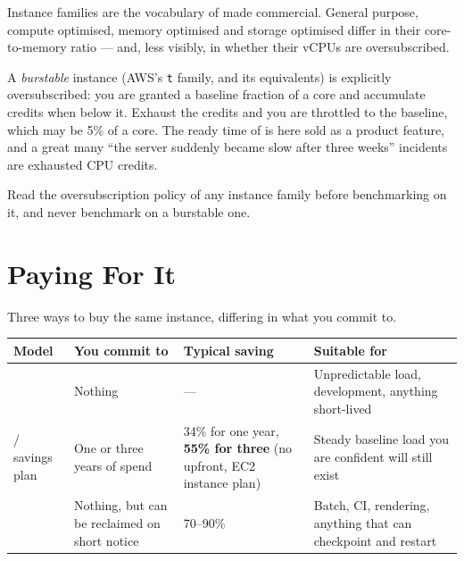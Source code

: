 \begin{alertbox}
Instance families are the vocabulary of  made commercial.
General purpose, compute optimised, memory optimised and storage optimised
differ in their core-to-memory ratio --- and, less visibly, in whether their
vCPUs are oversubscribed.

\smallskip
A \emph{burstable} instance (AWS's \texttt{t} family, and its equivalents) is
explicitly oversubscribed: you are granted a baseline fraction of a core and
accumulate credits when below it. Exhaust the credits and you are throttled to
the baseline, which may be 5\% of a core. The ready time of  is
here sold as a product feature, and a great many ``the server suddenly became
slow after three weeks'' incidents are exhausted CPU credits.

\smallskip
Read the oversubscription policy of any instance family before benchmarking on
it, and never benchmark on a burstable one.
\end{alertbox}

\section{Paying For It}

Three ways to buy the same instance, differing in what you commit to.

\begin{longtable}{@{}L{2.8cm}L{3.4cm}L{3.0cm}L{5.3cm}@{}}
\toprule
{}
\textbf{Model} & \textbf{You commit to} & \textbf{Typical saving} &
\textbf{Suitable for} \\
\midrule
\endhead
{} & Nothing & --- & Unpredictable load, development, anything
short-lived \\
 / savings plan & One or three years of spend & 34\% for one
year, \textbf{55\% for three} (no upfront, EC2 instance plan) & Steady baseline
load you are confident will still exist \\
 & Nothing, but can be reclaimed on short notice & 70--90\% &
Batch, CI, rendering, anything that can checkpoint and restart \\
\bottomrule
\end{longtable}

